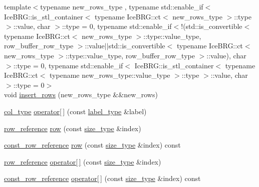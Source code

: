 \begin{DoxyCompactItemize}
\item 
{\footnotesize template$<$typename new\+\_\+rows\+\_\+type , typename std\+::enable\+\_\+if$<$ Ice\+B\+R\+G\+::is\+\_\+stl\+\_\+container$<$ typename Ice\+B\+R\+G\+::ct$<$ new\+\_\+rows\+\_\+type $>$\+::type $>$\+::value, char $>$\+::type  = 0, typename std\+::enable\+\_\+if$<$!(std\+::is\+\_\+convertible$<$ typename Ice\+B\+R\+G\+::ct$<$ new\+\_\+rows\+\_\+type $>$\+::type\+::value\+\_\+type, row\+\_\+buffer\+\_\+row\+\_\+type $>$\+::value$\vert$$\vert$std\+::is\+\_\+convertible$<$ typename Ice\+B\+R\+G\+::ct$<$ new\+\_\+rows\+\_\+type $>$\+::type\+::value\+\_\+type, row\+\_\+buffer\+\_\+row\+\_\+type $>$\+::value), char $>$\+::type  = 0, typename std\+::enable\+\_\+if$<$ Ice\+B\+R\+G\+::is\+\_\+stl\+\_\+container$<$ typename Ice\+B\+R\+G\+::ct$<$ typename new\+\_\+rows\+\_\+type\+::value\+\_\+type $>$\+::type $>$\+::value, char $>$\+::type  = 0$>$ }\\void \hyperlink{classIceBRG_1_1labeled__array_ab44aaff86f1ba7bc5970511421eff4ab}{insert\+\_\+rows} (new\+\_\+rows\+\_\+type \&\&new\+\_\+rows)
\item 
\hyperlink{classIceBRG_1_1labeled__array_a4ee8f2983b8f309f1a8a470c12f56f2f}{col\+\_\+type} \hyperlink{classIceBRG_1_1labeled__array_a9a6e216b68910cb9cacd546d789c6b92}{operator\mbox{[}$\,$\mbox{]}} (const \hyperlink{classIceBRG_1_1labeled__array_a6355a8e274be241162cfe4717bcd907f}{label\+\_\+type} \&label)
\item 
\hyperlink{classIceBRG_1_1labeled__array_a1bcd1efbba3ca49030c7acd8910195e6}{row\+\_\+reference} \hyperlink{classIceBRG_1_1labeled__array_a1670dd70eb7f972e6d7e1b9dbfdc2ecf}{row} (const \hyperlink{lib_2IceBRG__main_2common_8h_a566c61f2ca17211f4ba8557f3f65e8d3}{size\+\_\+type} \&index)
\item 
\hyperlink{classIceBRG_1_1labeled__array_ac210266c8ef4db02af31dd1a1a2625f5}{const\+\_\+row\+\_\+reference} \hyperlink{classIceBRG_1_1labeled__array_a0545dec781032c1f7dd763dc14eb8cb2}{row} (const \hyperlink{lib_2IceBRG__main_2common_8h_a566c61f2ca17211f4ba8557f3f65e8d3}{size\+\_\+type} \&index) const 
\item 
\hyperlink{classIceBRG_1_1labeled__array_a1bcd1efbba3ca49030c7acd8910195e6}{row\+\_\+reference} \hyperlink{classIceBRG_1_1labeled__array_a1dea7ee14604aad3fbc6b358578337a7}{operator\mbox{[}$\,$\mbox{]}} (const \hyperlink{lib_2IceBRG__main_2common_8h_a566c61f2ca17211f4ba8557f3f65e8d3}{size\+\_\+type} \&index)
\item 
\hyperlink{classIceBRG_1_1labeled__array_ac210266c8ef4db02af31dd1a1a2625f5}{const\+\_\+row\+\_\+reference} \hyperlink{classIceBRG_1_1labeled__array_aa49729a3afb8f89c73f92a8f983dbae1}{operator\mbox{[}$\,$\mbox{]}} (const \hyperlink{lib_2IceBRG__main_2common_8h_a566c61f2ca17211f4ba8557f3f65e8d3}{size\+\_\+type} \&index) const 

\end{DoxyCompactItemize}
